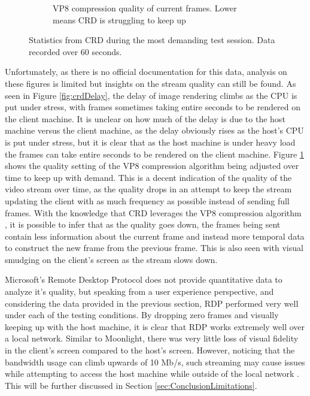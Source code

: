\begin{figure}[h]
\begin{subfigure}{.33\textwidth}
    \captionsetup{width=.85\linewidth}
    \caption{VP8 compression quality of current frames. Lower means CRD is struggling to keep up}
    \label{fig:crdQuality}
  \end{subfigure}
  \captionsetup{width=.8\linewidth}
  \caption[CRD Data]{Statistics from CRD during the most demanding test session. Data recorded over 60 seconds.}
  \label{fig:crdStats}
\end{figure}

Unfortunately, as there is no official documentation for this data, analysis on these figures is limited but insights on the stream quality can still be found.
As seen in Figure \ref{fig:crdDelay}, the delay of image rendering climbs as the CPU is put under stress, with frames sometimes taking entire seconds to be rendered on the client machine.
It is unclear on how much of the delay is due to the host machine versus the client machine, as the delay obviously rises as the host's CPU is put under stress, but it is clear that as the host machine is under heavy load the frames can take entire seconds to be rendered on the client machine.
Figure \ref{fig:crdQuality} shows the quality setting of the VP8 compression algorithm being adjusted over time to keep up with demand.
This is a decent indication of the quality of the video stream over time, as the quality drops in an attempt to keep the stream updating the client with as much frequency as possible instead of sending full frames.
With the knowledge that CRD leverages the VP8 compression algorithm \cite{miniorange_chromoting}, it is possible to infer that as the quality goes down, the frames being sent contain less information about the current frame and instead more temporal data to construct the new frame from the previous frame.
This is also seen with visual smudging on the client's screen as the stream slows down.

Microsoft's Remote Desktop Protocol does not provide quantitative data to analyze it's quality, but speaking from a user experience perspective, and considering the data provided in the previous section, RDP performed very well under each of the testing conditions.
By dropping zero frames and visually keeping up with the host machine, it is clear that RDP works extremely well over a local network.
Similar to Moonlight, there was very little loss of visual fidelity in the client's screen compared to the host's screen.
However, noticing that the bandwidth usage can climb upwards of 10 Mb/s, such streaming may cause issues while attempting to access the host machine while outside of the local network \cite{rdp_bandwidth}.
This will be further discussed in Section \ref{sec:ConclusionLimitations}.

